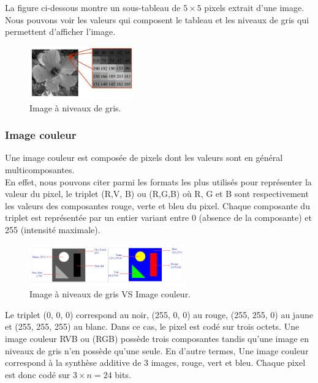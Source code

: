 La figure ci-dessous montre un sous-tableau de $5 \times 5$ pixels extrait d’une image. Nous pouvons voir les valeurs qui composent le tableau et les niveaux de gris qui permettent d’afficher l’image.

\begin{figure}[H]
	\centering
	\includegraphics[width=0.4\textwidth]{Figures/gray} 
	\caption{Image à niveaux de gris.}
\end{figure}


\subsubsection{Image couleur}
Une image couleur est composée de pixels dont les valeurs sont en général multicomposantes. \\

En effet, nous pouvons citer parmi les formats les plus utilisés pour représenter la valeur du pixel, le triplet (R,V, B) ou (R,G,B) où R, G et B sont respectivement les valeurs des composantes rouge, verte et bleu du pixel. Chaque composante du triplet est représentée par un entier variant entre 0
(absence de la composante) et 255 (intensité maximale). 

\begin{figure}[H]
	\centering
	\includegraphics[width=0.6\textwidth]{Figures/grayvscol} 
	\caption{Image à niveaux de gris VS Image couleur.}
\end{figure}

Le triplet (0, 0, 0) correspond au noir, (255, 0, 0) au rouge, (255, 255, 0) au jaune et (255, 255, 255) au blanc. 
Dans ce cas, le pixel est codé sur trois octets. Une image couleur RVB ou (RGB) possède trois composantes tandis qu'une image en niveaux de gris n’en possède qu’une seule. En d'autre termes, Une image couleur correspond à la synthèse additive de 3 images, rouge, vert et bleu. Chaque pixel est donc codé sur $3 \times n = 24 $ bits.

